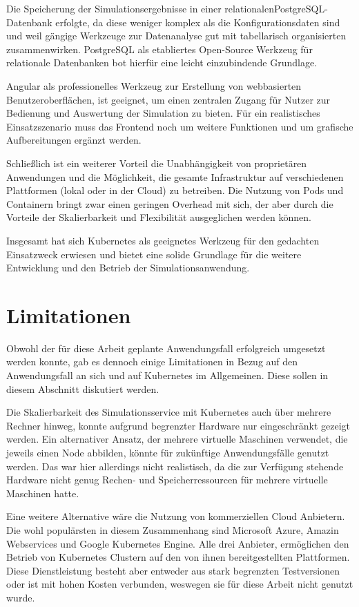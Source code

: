 \documentclass[11pt,a4paper]{article}
\begin{document}
Die Speicherung der Simulationsergebnisse in einer relationalen\linebreak PostgreSQL-Datenbank
erfolgte, da diese weniger komplex als die Konfigurationsdaten sind und weil
gängige Werkzeuge zur Datenanalyse gut mit tabellarisch organisierten zusammenwirken.
PostgreSQL als etabliertes Open-Source Werkzeug für relationale Datenbanken bot
hierfür eine leicht einzubindende Grundlage.

Angular als professionelles Werkzeug zur Erstellung von webbasierten Benutzeroberflächen,
ist geeignet, um einen zentralen Zugang für Nutzer zur Bedienung und Auswertung der Simulation zu bieten.
Für ein realistisches Einsatzszenario muss das Frontend noch um weitere Funktionen
und um grafische Aufbereitungen ergänzt werden.

Schließlich ist ein weiterer Vorteil die Unabhängigkeit von proprietären Anwendungen und die Möglichkeit, 
die gesamte Infrastruktur auf verschiedenen Plattformen (lokal oder in der Cloud) zu betreiben. 
Die Nutzung von Pods und Containern bringt zwar einen geringen Overhead mit sich,
der aber durch die Vorteile der Skalierbarkeit und Flexibilität ausgeglichen werden können.

Insgesamt hat sich Kubernetes als geeignetes Werkzeug für den gedachten Einsatzweck erwiesen 
und bietet eine solide Grundlage für die weitere Entwicklung und den Betrieb der Simulationsanwendung.


\section{Limitationen}
Obwohl der für diese Arbeit geplante Anwendungsfall erfolgreich umgesetzt werden konnte,
gab es dennoch einige Limitationen in Bezug auf den Anwendungsfall an sich und auf
Kubernetes im Allgemeinen. Diese sollen in diesem Abschnitt diskutiert werden.

Die Skalierbarkeit des Simulationsservice mit Kubernetes auch über mehrere Rechner hinweg,
konnte aufgrund begrenzter Hardware nur eingeschränkt gezeigt werden. Ein alternativer Ansatz,
der mehrere virtuelle Maschinen verwendet, die jeweils einen Node abbilden, könnte 
für zukünftige Anwendungsfälle genutzt werden. Das war hier allerdings nicht realistisch,
da die zur Verfügung stehende Hardware nicht genug Rechen- und Speicherressourcen
für mehrere virtuelle Maschinen hatte.

Eine weitere Alternative wäre die Nutzung von kommerziellen Cloud Anbietern.
Die wohl populärsten in diesem Zusammenhang sind Microsoft Azure,
Amazin Webservices und Google Kubernetes Engine. Alle drei Anbieter,
ermöglichen den Betrieb von Kubernetes Clustern auf den von 
ihnen bereitgestellten Plattformen. Diese Dienstleistung
besteht aber entweder aus stark begrenzten Testversionen oder
ist mit hohen Kosten verbunden, weswegen sie für diese Arbeit nicht genutzt wurde.
\end{document}
